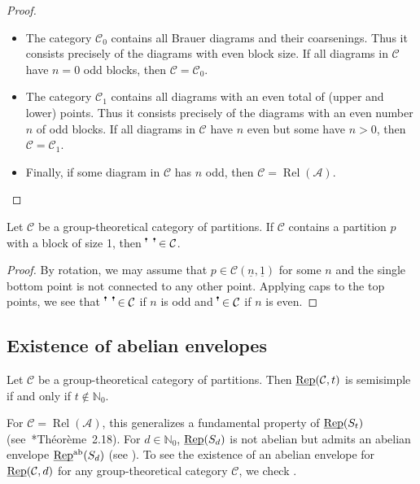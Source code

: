\documentclass[11pt]{amsart}
\newcommand{\pd}[2][black]{\filldraw[#1] (#2) circle (1.5pt)} %
\newcommand\upperdots[1]{\tikz[baseline=(origin.base),scale=0.5]{
    \coordinate (origin) at (0,0);
    \foreach \i in {0,...,\numexpr#1-1\relax} {
        \pd{0.5*\i,.5};
        \draw (0.5*\i,.3) -- (0.5*\i,.5);
    }
}}
\newcommand\Cref[1]{\zcref[S]{#1}}
\theoremstyle{definition}
\theoremstyle{remark}
\newcommand\cA{\mathcal A}
\newcommand\cC{\mathcal C}
\newcommand\uRep{\underline{\smash{\operatorname{Rep}}}}
\renewcommand\:\colon
\newcommand\NN{\mathbb N}
\renewcommand\:\colon
\newcommand\Rel{\operatorname{Rel}}
\newcommand\ab{^{\mathrm{ab}}}
\begin{document}
\begin{proof}
    \begin{itemize}
        \item The category $\cC_0$ contains all Brauer diagrams and their coarsenings. Thus it consists precisely of the diagrams with even block size. If all diagrams in $\cC$ have $n = 0$ odd blocks, then $\cC = \cC_0$.
        \item The category $\cC_1$ contains all diagrams with an even total of (upper and lower) points. Thus it consists precisely of the diagrams with an even number $n$ of odd blocks. If all diagrams in $\cC$ have $n$ even but some have $n > 0$, then $\cC = \cC_1$.
        \item Finally, if some diagram in $\cC$ has $n$ odd, then $\cC = \Rel(\cA)$. \qedhere
    \end{itemize}
\end{proof}

\begin{lemma} \label{l:no-single-points}
    Let $\cC$ be a group-theoretical category of partitions. If $\cC$ contains a partition $p$ with a block of size 1, then $\upperdots{2} \in \cC$.
\end{lemma}
\begin{proof}
    By rotation, we may assume that $p \in \cC(\underline{n}, \underline{1})$ for some $n$ and the single bottom point is not connected to any other point. Applying caps to the top points, we see that $\upperdots{2} \in \cC$ if $n$ is odd and $\upperdots{1} \in \cC$ if $n$ is even.
\end{proof}

\subsection{Existence of abelian envelopes} \label{ss:existence-of-abelian-envelopes}

\begin{proposition}
    Let $\cC$ be a group-theoretical category of partitions. Then $\uRep(\cC, t)$ is semisimple if and only if $t \notin \NN_0$.
\end{proposition}

For $\cC = \Rel(\cA)$, this generalizes a fundamental property of $\uRep(S_t)$ (see~\cite{deligne2007repst}*{Théorème~2.18}). For $d \in \NN_0$, $\uRep(S_d)$ is not abelian but admits an abelian envelope $\uRep\ab(S_d)$ (see \cite{comes2014repabst}). To see the existence of an abelian envelope for $\uRep(\cC, d)$ for any group-theoretical category $\cC$, we check \Cref{a:rank-object}.
\end{document}
